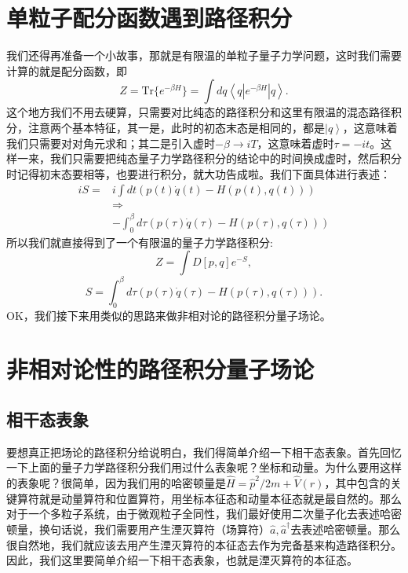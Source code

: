 \documentclass[12pt, a4paper, oneside]{ctexart}
\begin{document}
\section{单粒子配分函数遇到路径积分}
我们还得再准备一个小故事，那就是有限温的单粒子量子力学问题，这时我们需要计算的就是配分函数，即
\begin{equation}
    Z=\mathrm{Tr}\{ e^{-\beta H} \}=\int dq \left<q |e^{-\beta H}| q \right>.
\end{equation}
这个地方我们不用去硬算，只需要对比纯态的路径积分和这里有限温的混态路径积分，注意两个基本特征，其一是，此时的初态末态是相同的，都是$\left| q \right>$，这意味着我们只需要对对角元求和；其二是引入虚时$-\beta\rightarrow iT$，这意味着虚时$\tau=-it$。这样一来，我们只需要把纯态量子力学路径积分的结论中的时间换成虚时，然后积分时记得初末态要相等，也要进行积分，就大功告成啦。我们下面具体进行表述：
\begin{align}
    iS=&i\int dt (p(t)\dot q(t)-H(p(t),q(t)))\nonumber\\
    & \Rightarrow\nonumber\\ 
    &-\int_0^\beta d\tau(p(\tau)\dot q(\tau)-H(p(\tau),q(\tau)))
\end{align}
所以我们就直接得到了一个有限温的量子力学路径积分:
\begin{equation}
    Z=\int D[p,q]e^{-S},
\end{equation}
\begin{equation}
    S=\int_0^\beta d\tau(p(\tau)\dot q(\tau)-H(p(\tau),q(\tau))).
\end{equation}
OK，我们接下来用类似的思路来做非相对论的路径积分量子场论。

\section{非相对论性的路径积分量子场论}
\subsection{相干态表象}
要想真正把场论的路径积分给说明白，我们得简单介绍一下相干态表象。首先回忆一下上面的量子力学路径积分我们用过什么表象呢？坐标和动量。为什么要用这样的表象呢？很简单，因为我们用的哈密顿量是$\hat H=\hat p^2/2m+\hat V(r)$，其中包含的关键算符就是动量算符和位置算符，用坐标本征态和动量本征态就是最自然的。那么对于一个多粒子系统，由于微观粒子全同性，我们最好使用二次量子化去表述哈密顿量，换句话说，我们需要用产生湮灭算符（场算符）$\hat a,\hat a^\dagger$去表述哈密顿量。那么很自然地，我们就应该去用产生湮灭算符的本征态去作为完备基来构造路径积分。因此，我们这里要简单介绍一下相干态表象，也就是湮灭算符的本征态。
\end{document}
